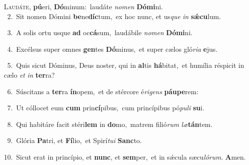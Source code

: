 \lettrine{\initial\textcolor{\initialcolor}{L}}{audáte,} \textbf{pú}\-eri, \textbf{Dó}\-minum:~\star laudáte \textit{no}\-\textit{men} \textbf{Dó}\-\textbf{mi}ni.\\
{\numbfont\textcolor{\numbcolor}{~2.}}~Sit nomen Dómini \textbf{be}\-ne\-\textbf{díc}\-tum,~\star ex hoc nunc, et us\textit{que} \textit{in} \textbf{sǽ}\-\textbf{cu}lum.\par
{\numbfont\textcolor{\numbcolor}{~3.}}~A solis ortu usque \textbf{ad} oc\-\textbf{cá}\-sum,~\star laudábile \textit{no}\-\textit{men} \textbf{Dó}\-\textbf{mi}ni.\par
{\numbfont\textcolor{\numbcolor}{~4.}}~Excélsus super omnes \textbf{gen}\-tes \textbf{Dó}\-minus,~\star et super cælos gló\-\textit{ri}\-\textit{a} \textbf{e}\-jus.\par
{\numbfont\textcolor{\numbcolor}{~5.}}~Quis sicut Dóminus, Deus noster, qui in \textbf{al}\-tis \textbf{há}\-bitat,~\star et humília réspicit in cælo \textit{et} \textit{in} \textbf{ter}\-ra?\par
{\numbfont\textcolor{\numbcolor}{~6.}}~Súscitans a \textbf{ter}\-ra \textbf{ín}\-opem,~\star et de stércore é\-\textit{ri}\-\textit{gens} \textbf{páu}\-\textbf{pe}rem:\par
{\numbfont\textcolor{\numbcolor}{~7.}}~Ut cóllocet eum \textbf{cum} prin\-\textbf{cí}\-pibus,~\star cum princípibus pó\-\textit{pu}\-\textit{li} \textbf{su}\-i.\par
{\numbfont\textcolor{\numbcolor}{~8.}}~Qui habitáre facit stéri\textbf{lem} in \textbf{do}\-mo,~\star matrem filió\textit{rum} \textit{læ}\-\textbf{tán}tem.\par
{\numbfont\textcolor{\numbcolor}{~9.}}~Glória \textbf{Pa}\-tri, et \textbf{Fí}\-lio,~\star et Spirí\-\textit{tu}\-\textit{i} \textbf{Sanc}\-to.\par
{\numbfont\textcolor{\numbcolor}{10.}}~Sicut erat in princípio, et \textbf{nunc}\-, et \textbf{sem}\-per,~\star et in sǽcula sæcu\-\textit{ló}\-\textit{rum}. \textbf{A}\-men.\par
